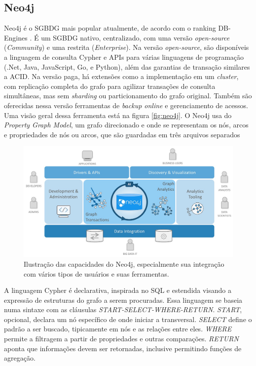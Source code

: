 \documentclass[conference]{IEEEtran}
\begin{document}
\subsection{Neo4j}

Neo4j é o SGBDG mais popular atualmente, de acordo com o ranking DB-Engines \cite{db_engines}. É um SGBDG nativo, centralizado, com uma versão \emph{open-source} (\emph{Community}) e uma restrita (\emph{Enterprise}). Na versão \emph{open-source}, são disponíveis a linguagem de consulta Cypher e APIs para várias linguagens de programação (.Net, Java, JavaScript, Go, e Python), além das garantias de transação similares a ACID. Na versão paga, há extensões como a implementação em um \emph{cluster}, com replicação completa do grafo para agilizar transações de consulta simultâneas, mas sem \emph{sharding} ou particionamento do grafo original. Também são oferecidas nessa versão ferramentas de \emph{backup online} e gerenciamento de acessos. Uma visão geral dessa ferramenta está na figura \ref{fig:neo4j}. O Neo4j usa do \emph{Property Graph Model}, um grafo direcionado e onde se representam os nós, arcos e propriedades de nós ou arcos, que são guardadas em três arquivos separados

\begin{figure}[htbp]
\centerline{\includegraphics[width=0.9\linewidth]{neo4j_graph_platform.jpg}}
\caption{Ilustração das capacidades do Neo4j, especialmente sua integração com vários tipos de usuários e suas ferramentas.}\label{fig:neo4j}
\label{fig}
\end{figure}

A linguagem Cypher é declarativa, inspirada no SQL e estendida visando a expressão de estruturas do grafo a serem procuradas. Essa linguagem se baseia numa sintaxe com as cláusulas \emph{START-SELECT-WHERE-RETURN}. \emph{START}, opcional, declara um nó específico de onde iniciar a transversal. \emph{SELECT} define o padrão a ser buscado, tipicamente em nós e as relações entre eles. \emph{WHERE} permite a filtragem a partir de propriedades e outras comparações. \emph{RETURN} aponta que informações devem ser retornadas, inclusive permitindo funções de agregação.
\end{document}
